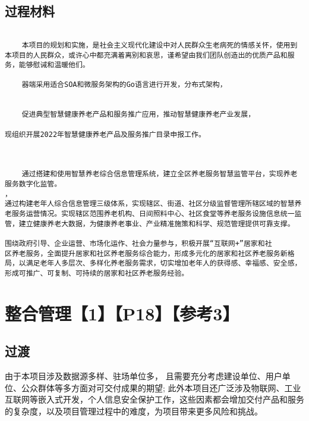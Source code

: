 \documentclass[UTF8]{../computerUniverse}
\begin{document}
\section{过程材料}
\begin{lstlisting}

    本项目的规划和实施，是社会主义现代化建设中对人民群众生老病死的情感关怀，使用到本项目的人民群众，或许心中都充满着离别和哀思，谨希望由我们团队创造出的优质产品和服务，能够慰诫和温暖他们。

    器端采用适合SOA和微服务架构的Go语言进行开发，分布式架构，

    
    促进典型智慧健康养老产品和服务推广应用，推动智慧健康养老产业发展，

现组织开展2022年智慧健康养老产品及服务推广目录申报工作。


    
    通过搭建和使用智慧养老综合信息管理系统，建立全区养老服务智慧监管平台，实现养老服务数字化监管。
，
通过构建老年人综合信息管理三级体系，实现辖区、街道、社区分级监督管理所辖区域的智慧养老服务运营情况。实现辖区范围养老机构、日间照料中心、社区食堂等养老服务设施信息统一监管，建立健康养老大数据，为健康养老事业、产业精准施策和科学、规范管理提供可靠支撑。

围绕政府引导、企业运营、市场化运作、社会力量参与，积极开展“互联网+”居家和社
区养老服务，全面提升居家和社区养老服务综合能力，形成多元化的居家和社区养老服务新格局，以满足老年人多层次、多样化养老服务需求，切实增加老年人的获得感、幸福感、安全感，形成可推广、可复制、可持续的居家和社区养老服务经验。

\end{lstlisting}




\chapter{整合管理【1】【P18】【参考3】}



\section{过渡}


由于本项目涉及数据源多样、驻场单位多，
且需要充分考虑建设单位、用户单位、公众群体等多方面对可交付成果的期望;
此外本项目还广泛涉及物联网、工业互联网等嵌入式开发，个人信息安全保护工作，这些因素都会增加交付产品和服务的复杂度，以及项目管理过程中的难度，为项目带来更多风险和挑战。
\end{document}

